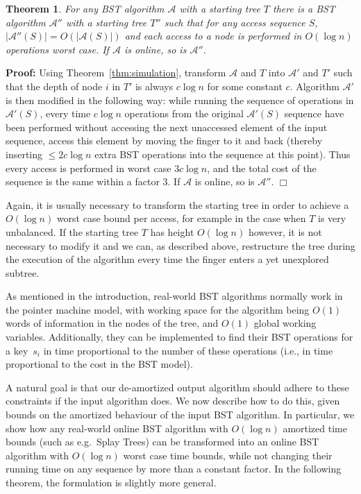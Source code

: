 \documentclass[11pt]{article}
\newtheorem{theorem}{Theorem}
\newenvironment{proof}{\noindent\textbf{Proof: }\ignorespaces}
  {\hspace*{\fill}$\Box$\medskip}
\def\A{{\mathcal{A}}}
\begin{document}
\begin{theorem}\label{thm:offline}
For any BST algorithm $\A$ with a starting tree $T$ there is a BST
algorithm $\A''$ with a starting tree $T''$ such that for any access
sequence $S$, $|\A''(S)| = O(|\A(S)|)$ and each access to a node is
performed in $O(\log n)$ operations worst case. If $\A$ is online, so is $\A''$.
\end{theorem}
\begin{proof}
Using Theorem~\ref{thm:simulation}, transform $\A$ and $T$ into $\A'$ and
$T'$ such that the depth of node $i$ in $T'$ is always $c\log n$ for some
constant $c$.  Algorithm $\A'$ is then modified in the following way: while
running the sequence of operations in $\A'(S)$, every time $c\log n$
operations from the original $\A'(S)$ sequence have been performed without accessing the next unaccessed
element of the input sequence, access this element by moving the finger to it
and back (thereby inserting $\leq 2c\log n$ extra BST operations into the sequence at this point).
Thus every access is performed in worst case $3c\log n$, and the total cost of the sequence is
the same within a factor $3$. If $\A$ is online, so is $\A''$.
\end{proof}

Again, it is usually necessary to transform the starting tree in order to
achieve a $O(\log n)$ worst case bound per access, for example in the case
when $T$ is very unbalanced.  If the starting tree $T$ has height $O(\log
n)$ however, it is not necessary to modify it and we can, as described
above, restructure the tree during the execution of the algorithm every
time the finger enters a yet unexplored subtree.

As mentioned in the introduction, real-world BST algorithms normally work
in the pointer machine model, with working space for the algorithm being
$O(1)$ words of information in the nodes of the tree, and $O(1)$ global
working variables. Additionally, they can be implemented to find their BST
operations for a key~$s_i$ in time proportional to the number of these
operations (i.e., in time proportional to the cost in the BST model).

A natural goal is that our de-amortized output algorithm should adhere to
these constraints if the input algorithm does. We now describe how to do
this, given bounds on the amortized behaviour of the input BST
algorithm. In particular, we show how any real-world online BST algorithm
with $O(\log n)$ amortized time bounds (such as e.g.\ Splay Trees) can be
transformed into an online BST algorithm with $O(\log n)$ worst case time
bounds, while not changing their running time on any sequence by more than
a constant factor. In the following theorem, the formulation is slightly
more general.
\end{document}
